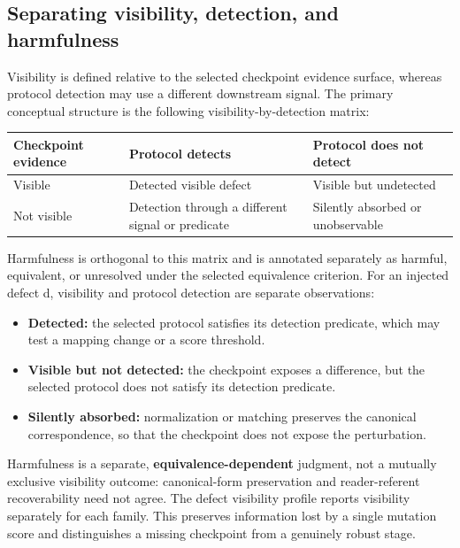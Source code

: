 \documentclass[10pt,conference]{IEEEtran}
\begin{document}
\subsection{Separating visibility, detection, and harmfulness}
Visibility is defined relative to the selected checkpoint evidence surface, whereas protocol detection may use a different downstream signal.
The primary conceptual structure is the following visibility-by-detection matrix:
\begin{table}[t]
\centering
\small
\setlength{\tabcolsep}{3pt}
\begin{tabular}{>{\raggedright\arraybackslash}p{}>{\raggedright\arraybackslash}p{}>{\raggedright\arraybackslash}p{}}
\hline
Checkpoint evidence & Protocol detects & Protocol does not detect \\
\hline
Visible & Detected visible defect & Visible but undetected \\
Not visible & Detection through a different signal or predicate & Silently absorbed or unobservable \\
\hline
\end{tabular}
\end{table}
Harmfulness is orthogonal to this matrix and is annotated separately as harmful, equivalent, or unresolved under the selected equivalence criterion.
For an injected defect d, visibility and protocol detection are separate observations:
\begin{itemize}
\item \textbf{Detected:} the selected protocol satisfies its detection predicate, which may test a mapping change or a score threshold.
\item \textbf{Visible but not detected:} the checkpoint exposes a difference, but the selected protocol does not satisfy its detection predicate.
\item \textbf{Silently absorbed:} normalization or matching preserves the canonical correspondence, so that the checkpoint does not expose the perturbation.
\end{itemize}
Harmfulness is a separate, \textbf{equivalence-dependent} judgment, not a mutually exclusive visibility outcome: canonical-form preservation and reader-referent recoverability need not agree.
The defect visibility profile reports visibility separately for each family. This preserves information lost by a single mutation score and distinguishes a missing checkpoint from a genuinely robust stage.
\end{document}
